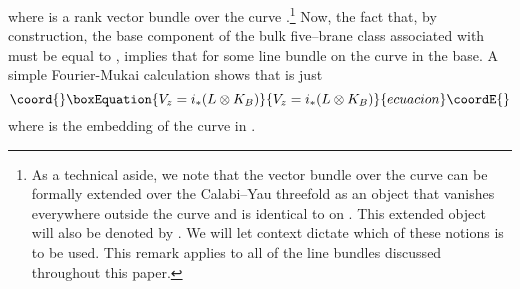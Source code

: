 \documentclass[a4paper,12pt]{article}
\numberwithin{equation}{section}
\theoremstyle{plain}
\begin{document}
where \coordHE{} is a rank \coordHE{} vector bundle over the curve \coordHE{}.\footnote{As a technical aside, we note that the vector bundle
\coordHE{} over the curve \coordHE{} can be formally extended over the Calabi--Yau
threefold \coordHE{} as an object that vanishes everywhere outside the curve
\coordHE{} and is identical to \coordHE{} on \coordHE{}. 
This extended object will also be
denoted by \coordHE{}. We will let context dictate which of these notions is to
be used. This remark applies to all of the line bundles discussed throughout
this paper.} Now, the fact that, by construction, the base component of the
bulk five--brane class associated with \coordHE{} must be equal to \coordHE{}, implies that \coordHE{} for some line bundle \coordHE{} on the
curve \coordHE{} in the base. A simple Fourier-Mukai calculation shows that
\coordHE{} is  just
\begin{equation}\coord{}\boxEquation{
V_{z}=i_{*}(L \otimes K_{B})
\label{eq:62}
}{
V_{z}=i_{*}(L \otimes K_{B})
}{ecuacion}\coordE{}\end{equation}
where \coordHE{} is the embedding \coordHE{} of the
curve \coordHE{} in \coordHE{}.
\end{document}
